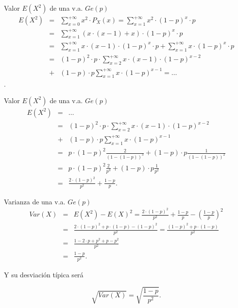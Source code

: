 \documentclass[
  ignorenonframetext,
  aspectratio=169]{beamer}
\begin{document}
\begin{frame}{Valor \(E(X^2)\) de una v.a. \(Ge(p)\)}
\protect\hypertarget{valor-ex2-de-una-v.a.-gep}{}
\begin{eqnarray*}
E(X^2)&=&\sum_{x=0}^{+\infty} x^2\cdot P_X(x)=\sum_{x=1}^{+\infty} x^2\cdot (1-p)^x\cdot p\\
&=& 
\sum_{x=1}^{+\infty} (x\cdot (x-1)+x)\cdot (1-p)^{x}\cdot p\\
&=&
\sum_{x=1}^{+\infty} x\cdot (x-1)\cdot (1-p)^{x}\cdot p+\sum_{x=1}^{+\infty} x \cdot (1-p)^{x}\cdot p\\
&=&
(1-p)^{2}\cdot p\cdot \sum_{x=2}^{+\infty} x\cdot (x-1)\cdot (1-p)^{x-2}\\ 
&  +&   (1-p)\cdot p\sum_{x=1}^{+\infty} x \cdot (1-p)^{x-1} = \ldots
\end{eqnarray*}.
\end{frame}

\begin{frame}{Valor \(E(X^2)\) de una v.a. \(Ge(p)\)}
\protect\hypertarget{valor-ex2-de-una-v.a.-gep-1}{}
\begin{eqnarray*}
E(X^2)&=&\ldots\\
&=&
(1-p)^{2}\cdot p\cdot \sum_{x=2}^{+\infty} x\cdot (x-1)\cdot (1-p)^{x-2}\\ 
&  +&   (1-p)\cdot p\sum_{x=1}^{+\infty} x \cdot (1-p)^{x-1}\\
&=&
p\cdot (1-p)^2 \frac{2}{(1-(1-p))^3}+  (1-p)\cdot p \frac{1}{(1-(1-p))^2}\\
&=&
p\cdot (1-p)^2 \frac{2}{p^3}+  (1-p)\cdot p \frac{1}{p^2}\\
&=&\frac{2\cdot (1-p)^2}{p^2}+\frac{1-p}{p}.
\end{eqnarray*}
\end{frame}

\begin{frame}{Varianza de una v.a. \(Ge(p)\)}
\protect\hypertarget{varianza-de-una-v.a.-gep}{}
\begin{eqnarray*}
Var(X)&=&E(X^2)-E(X)^2=\frac{2\cdot (1-p)^2}{p^2}+\frac{1-p}{p}-\left(\frac{1-p}{p}\right)^2\\
&=&
\frac{2\cdot (1-p)^2+p\cdot(1-p)-(1-p)^2}{p^2}=\frac{(1-p)^2+p\cdot(1-p)}{p^2}\\
&=&
\frac{1-2\cdot p + p^2+p-p^2}{p^2}\\
&=& \frac{1-p}{p^2}.
\end{eqnarray*}

Y su desviación típica será

\[\sqrt{Var(X)}=\sqrt{\frac{1-p}{p^2}}.\]
\end{frame}
\end{document}
